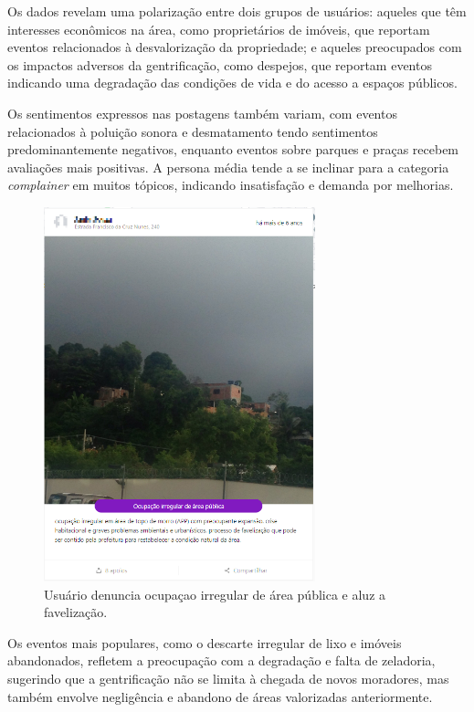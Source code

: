 Os dados revelam uma polarização entre dois grupos de usuários: aqueles que têm interesses econômicos na área, como proprietários de imóveis, que reportam eventos relacionados à desvalorização da propriedade; e aqueles preocupados com os impactos adversos da gentrificação, como despejos, que reportam eventos indicando uma degradação das condições de vida e do acesso a espaços públicos.

Os sentimentos expressos nas postagens também variam, com eventos relacionados à poluição sonora e desmatamento tendo sentimentos predominantemente negativos, enquanto eventos sobre parques e praças recebem avaliações mais positivas. A persona média tende a se inclinar para a categoria \textit{complainer} em muitos tópicos, indicando insatisfação e demanda por melhorias.

\begin{figure}[htb]
	\centering
	\includegraphics[width=0.7\textwidth]{images/colab_posts_social_favelizacao.png}
	\caption{Usuário denuncia ocupaçao irregular de área pública e aluz a favelização.}
	\label{fig:colab_posts_social_favelizacao}
\end{figure}

Os eventos mais populares, como o descarte irregular de lixo e imóveis abandonados, refletem a preocupação com a degradação e falta de zeladoria, sugerindo que a gentrificação não se limita à chegada de novos moradores, mas também envolve negligência e abandono de áreas valorizadas anteriormente.

